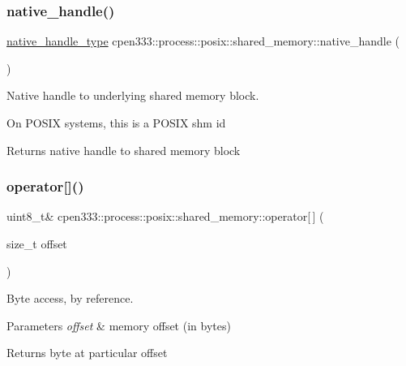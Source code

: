 \subsubsection{\texorpdfstring{native\+\_\+handle()}{native\_handle()}}
{\footnotesize\ttfamily \hyperlink{classcpen333_1_1process_1_1posix_1_1shared__memory_a4bec0d0093c8bcfa3283a5da8ef1fc78}{native\+\_\+handle\+\_\+type} cpen333\+::process\+::posix\+::shared\+\_\+memory\+::native\+\_\+handle (\begin{DoxyParamCaption}{ }\end{DoxyParamCaption})\hspace{0.3cm}{\ttfamily [inline]}}



Native handle to underlying shared memory block. 

On P\+O\+S\+IX systems, this is a P\+O\+S\+IX shm id

\begin{DoxyReturn}{Returns}
native handle to shared memory block 
\end{DoxyReturn}
\mbox{\label{classcpen333_1_1process_1_1posix_1_1shared__memory_a832b82cb6ab398e814418b516dba2dd9}} 
\subsubsection{\texorpdfstring{operator[]()}{operator[]()}}
{\footnotesize\ttfamily uint8\+\_\+t\& cpen333\+::process\+::posix\+::shared\+\_\+memory\+::operator\mbox{[}$\,$\mbox{]} (\begin{DoxyParamCaption}\item[{size\+\_\+t}]{offset }\end{DoxyParamCaption})\hspace{0.3cm}{\ttfamily [inline]}}



Byte access, by reference. 


\begin{DoxyParams}{Parameters}
{\em offset} & memory offset (in bytes) \\
\hline
\end{DoxyParams}
\begin{DoxyReturn}{Returns}
byte at particular offset 
\end{DoxyReturn}
\mbox{\label{classcpen333_1_1process_1_1posix_1_1shared__memory_a3b6d67a41cfaca3712d87958682d8bbe}} 
